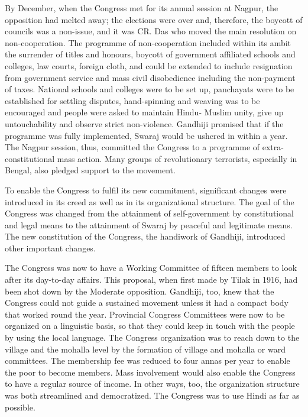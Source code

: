 \begin{multicols}{2}
By December, when the Congress met for its annual session at Nagpur, the opposition had melted away; the elections were over and, therefore, the boycott of councils was a non-issue, and it was CR. Das who moved the main resolution on non-cooperation. The programme of non-cooperation included within its ambit the surrender of titles and honours, boycott of government affiliated schools and colleges, law courts, foreign cloth, and could be extended to include resignation from government service and mass civil disobedience including the non-payment of taxes. National schools and colleges were to be set up, panchayats were to be established for settling disputes, hand-spinning and weaving was to be encouraged and people were asked to maintain Hindu- Muslim unity, give up untouchability and observe strict non-violence. Gandhiji promised that if the programme was fully implemented, Swaraj would be ushered in within a year. The Nagpur session, thus, committed the Congress to a programme of extra-constitutional mass action. Many groups of revolutionary terrorists, especially in Bengal, also pledged support to the movement. 

To enable the Congress to fulfil its new commitment, significant changes were introduced in its creed as well as in its organizational structure. The goal of the Congress was changed from the attainment of self-government by constitutional and legal means to the attainment of Swaraj by peaceful and legitimate means. The new constitution of the Congress, the handiwork of Gandhiji, introduced other important changes. 

The Congress was now to have a Working Committee of fifteen members to look after its day-to-day affairs. This proposal, when first made by Tilak in 1916, had been shot down by the Moderate opposition. Gandhiji, too, knew that the Congress could not guide a sustained movement unless it had a compact body that worked round the year. Provincial Congress Committees were now to be organized on a linguistic basis, so that they could keep in touch with the people by using the local language. The Congress organization was to reach down to the village and the mohalla level by the formation of village and mohalla or ward committees. The membership fee was reduced to four annas per year to enable the poor to become members. Mass involvement would also enable the Congress to have a regular source of income. In other ways, too, the organization structure was both streamlined and democratized. The Congress was to use Hindi as far as possible.


\end{multicols}
